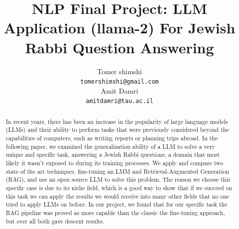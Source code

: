 \documentclass[11pt]{article}
\title{NLP Final Project: LLM Application (llama-2) For
Jewish Rabbi Question Answering}
\author{Tomer shimshi \\
  \texttt{tomershimshi@gmail.com} \\\And
  Amit Damri \\
  \texttt{amitdamri@tau.ac.il} \\}
\begin{document}
\maketitle
\begin{abstract}
In recent years, there has been an increase in the popularity of large language models (LLMs) and their ability to perform tasks that were previously considered beyond the capabilities of computers, such as writing reports or planning trips abroad. In the following paper, we examined the generalization ability of a LLM to solve a very unique and specific task, answering a Jewish Rabbi questions, a domain that most likely it wasn't exposed to during its training processes. We apply and compare two state of the art techniques, fine-tuning an LMM and Retrieval-Augmented Generation (RAG), and use an open source LLM to solve this problem. The reason we choose this specific case is due to its niche field, which is a good way to show that if we succeed on this task we can apply the results we would receive into many other fields that no one tried to apply LLMs on before.
In our project, we found that for our specific task the RAG pipeline was proved as more capable than the classic the fine-tuning approach, but over all both gave descent results.
\end{abstract}
\end{document}
